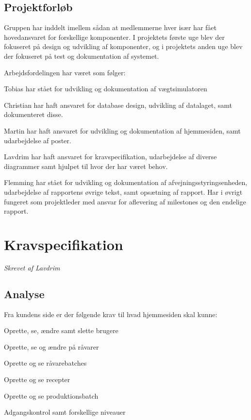\documentclass[a4paper]{article}
\newenvironment{my_itemize}
{\begin{itemize}
  \setlength{\itemsep}{1pt}
  \setlength{\parskip}{0pt}
  \setlength{\parsep}{0pt}}
{\end{itemize}}
\begin{document}
\subsection{Projektforløb} %

Gruppen har inddelt imellem sådan at medlemmerne hver især har fået hovedansvaret for forskellige komponenter. I projektets første uge blev der fokuseret på design og udvikling af komponenter, og i projektets anden uge blev der fokuseret på test og dokumentation af systemet.

Arbejdsfordelingen har været som følger:

\begin{my_itemize}
  \item Tobias har stået for udvikling og dokumentation af vægtsimulatoren
  \item Christian har haft ansvaret for database design, udvikling af datalaget, samt dokumenteret disse.
  \item Martin har haft ansvaret for udvikling og dokumentation af hjemmesiden, samt udarbejdelse af poster.
  \item Lavdrim har haft ansvaret for kravspecifikation, udarbejdelse af diverse diagrammer samt hjulpet til hvor der har været behov.
  \item Flemming har stået for udvikling og dokumentation af afvejningsstyringsenheden, udarbejdelse af rapportens øvrige tekst, samt opsætning af rapport. Har i øvrigt fungeret som projektleder med ansvar for aflevering af milestones og den endelige rapport.
 
\end{my_itemize}


\clearpage



\section{Kravspecifikation} %
\emph{Skrevet af Lavdrim}

\subsection{Analyse} %
Fra kundens side er der følgende krav til hvad hjemmesiden skal kunne:

\begin{my_itemize}
  \item Oprette, se, ændre samt slette brugere
  \item Oprette, se og ændre på råvarer
  \item Oprette og se råvarebatches
  \item Oprette og se recepter
  \item Oprette og se produktionsbatch
  \item Adgangskontrol samt forskellige niveauer
\end{my_itemize}
\end{document}
